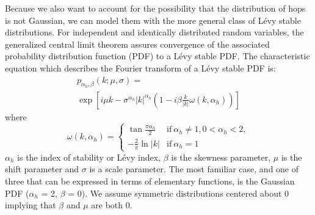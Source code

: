 \documentclass[journal=ancac3,manuscript=article,layout=twocolumn]{achemso}
\begin{document}
  Because we also want to account for the possibility that the distribution of
  hops is not Gaussian, we can model them with the more general class of L\'evy
  stable distributions. For independent and identically distributed random
  variables, the generalized central limit theorem assures convergence of the
  associated probability distribution function (PDF) to a L\'evy stable PDF.
  \cite{klages_anomalous_2008} The characteristic equation which describes the
  Fourier transform of a L\'evy stable PDF is: 
  \begin{equation}
  \begin{split}
    p_{\alpha_h, \beta}(k;\mu,\sigma) =~~~~~~~~~~~~~~~~~~~~~~~~~~~~~~~~~~~~~~~~~~~~~ \\
    \exp\left[i\mu k - \sigma^{\alpha_h}|k|^{\alpha_h}\left(1 - i\beta\frac{k}{|k|}\omega(k, \alpha_h)\right)\right]
  \end{split}
  \end{equation}
  where \\
  \[\omega(k, \alpha_h) = \begin{cases}
  	\tan{\frac{\pi \alpha_h}{2}} & \text{if}~\alpha_h \neq 1, 0 < \alpha_h < 2, \\
  	-\frac{2}{\pi}\ln |k| & \text{if}~\alpha_h = 1
  	 \end{cases}
  \]
  $\alpha_h$ is the index of stability or L\'evy index, $\beta$ is the skewness 
  parameter, $\mu$ is the shift parameter and $\sigma$ is a scale parameter. The most
  familiar case, and one of three that can be expressed in terms of elementary functions,
  is the Gaussian PDF ($\alpha_h$ = 2, $\beta$ = 0). We assume symmetric distributions
  centered about 0 implying that $\beta$ and $\mu$ are both 0.
  
\end{document}
